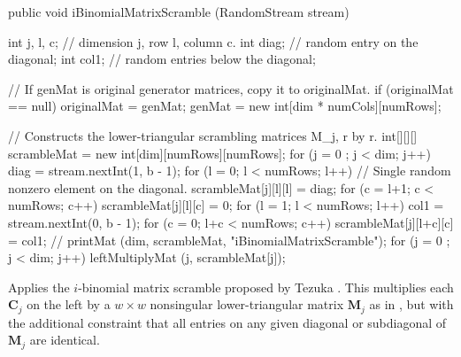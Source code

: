 \begin{code}

   public void iBinomialMatrixScramble (RandomStream stream)\begin{hide} {
      int j, l, c;  // dimension j, row l, column c.
      int diag;     // random entry on the diagonal;
      int col1;     // random entries below the diagonal;

      // If genMat is original generator matrices, copy it to originalMat.
      if (originalMat == null) {
         originalMat = genMat;
         genMat = new int[dim * numCols][numRows];
      }

      // Constructs the lower-triangular scrambling matrices M_j, r by r.
      int[][][] scrambleMat = new int[dim][numRows][numRows];
      for (j = 0 ; j < dim; j++) {
         diag = stream.nextInt(1, b - 1);
         for (l = 0; l < numRows; l++) {
            // Single random nonzero element on the diagonal.
            scrambleMat[j][l][l] = diag;
            for (c = l+1; c < numRows; c++) scrambleMat[j][l][c] = 0;
         }
         for (l = 1; l < numRows; l++) {
            col1 = stream.nextInt(0, b - 1);
            for (c = 0; l+c < numRows; c++) scrambleMat[j][l+c][c] = col1;
         }
      }
      // printMat (dim, scrambleMat,  "iBinomialMatrixScramble");
      for (j = 0 ; j < dim; j++) leftMultiplyMat (j, scrambleMat[j]);
   }\end{hide}
\end{code}
 \begin{tabb}
   Applies the $i$-binomial matrix scramble proposed by Tezuka \cite{rTEZ02a}
   .
   This multiplies each $\mathbf{C}_j$ on the left
   by a $w\times w$ nonsingular lower-triangular matrix $\mathbf{M}_j$ as in
   , but with the additional constraint that
   all entries on any given diagonal or subdiagonal of $\mathbf{M}_j$ are identical.
\end{tabb}
\begin{htmlonly}
\end{htmlonly}
